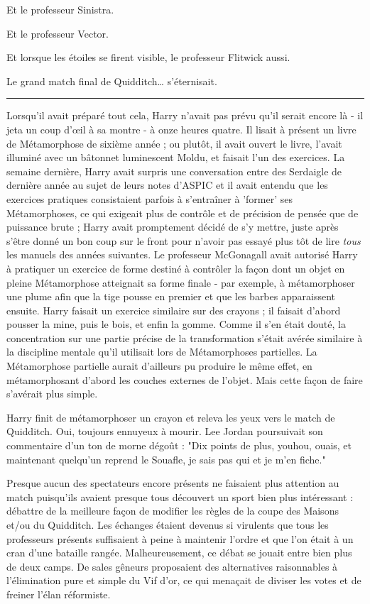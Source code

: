 Et le professeur Sinistra.

Et le professeur Vector.

Et lorsque les étoiles se firent visible, le professeur Flitwick aussi.

Le grand match final de Quidditch… s'éternisait.
\par\noindent\rule{\textwidth}{0.4pt}
Lorsqu'il avait préparé tout cela, Harry n'avait pas prévu qu'il serait encore là - il jeta un coup d'œil à sa montre - à onze heures quatre. Il lisait à présent un livre de Métamorphose de sixième année ; ou plutôt, il avait ouvert le livre, l'avait illuminé avec un bâtonnet luminescent Moldu, et faisait l'un des exercices. La semaine dernière, Harry avait surpris une conversation entre des Serdaigle de dernière année au sujet de leurs notes d'ASPIC et il avait entendu que les exercices pratiques consistaient parfois à s'entraîner à 'former' ses Métamorphoses, ce qui exigeait plus de contrôle et de précision de pensée que de puissance brute ; Harry avait promptement décidé de s'y mettre, juste après s'être donné un bon coup sur le front pour n'avoir pas essayé plus tôt de lire \emph{tous}  les manuels des années suivantes. Le professeur McGonagall avait autorisé Harry à pratiquer un exercice de forme destiné à contrôler la façon dont un objet en pleine Métamorphose atteignait sa forme finale - par exemple, à métamorphoser une plume afin que la tige pousse en premier et que les barbes apparaissent ensuite. Harry faisait un exercice similaire sur des crayons ; il faisait d'abord pousser la mine, puis le bois, et enfin la gomme. Comme il s'en était douté, la concentration sur une partie précise de la transformation s'était avérée similaire à la discipline mentale qu'il utilisait lors de Métamorphoses partielles. La Métamorphose partielle aurait d'ailleurs pu produire le même effet, en métamorphosant d'abord les couches externes de l'objet. Mais cette façon de faire s'avérait plus simple.

Harry finit de métamorphoser un crayon et releva les yeux vers le match de Quidditch. Oui, toujours ennuyeux à mourir. Lee Jordan poursuivait son commentaire d'un ton de morne dégoût : "Dix points de plus, youhou, ouais, et maintenant quelqu'un reprend le Souafle, je sais pas qui et je m'en fiche."

Presque aucun des spectateurs encore présents ne faisaient plus attention au match puisqu'ils avaient presque tous découvert un sport bien plus intéressant : débattre de la meilleure façon de modifier les règles de la coupe des Maisons et/ou du Quidditch. Les échanges étaient devenus si virulents que tous les professeurs présents suffisaient à peine à maintenir l'ordre et que l'on était à un cran d'une bataille rangée. Malheureusement, ce débat se jouait entre bien plus de deux camps. De sales gêneurs proposaient des alternatives raisonnables à l'élimination pure et simple du Vif d'or, ce qui menaçait de diviser les votes et de freiner l'élan réformiste.

